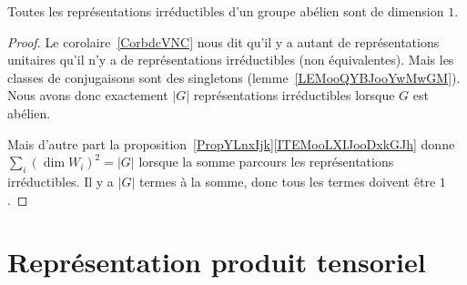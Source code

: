 \begin{corollary}       \label{CORooWAGXooByrelO}
    Toutes les représentations irréductibles d'un groupe abélien sont de dimension \( 1\).
\end{corollary}

\begin{proof}
    Le corolaire~\ref{CorbdcVNC} nous dit qu'il y a autant de représentations unitaires qu'il n'y a de représentations irréductibles (non équivalentes). Mais les classes de conjugaisons sont des singletons (lemme~\ref{LEMooQYBJooYwMwGM}). Nous avons donc exactement \( | G |\) représentations irréductibles lorsque \( G\) est abélien.

    Mais d'autre part la proposition~\ref{PropYLnxIjk}\ref{ITEMooLXIJooDxkGJh} donne \( \sum_i(\dim W_i)^2=| G |\) lorsque la somme parcours les représentations irréductibles. Il y a \( | G |\) termes à la somme, donc tous les termes doivent être \( 1\).
\end{proof}

\section{Représentation produit tensoriel}

